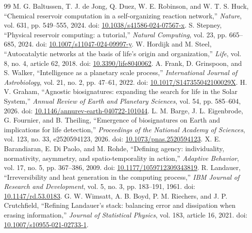 \documentclass[11pt]{article}
\begin{document}
\begin{thebibliography}{99}
 M. G. Baltussen, T. J. de Jong, Q. Duez, W. E. Robinson, and W. T. S. Huck, ``Chemical reservoir computation in a self-organizing reaction network,'' \emph{Nature}, vol. 631, pp. 549--555, 2024. doi: \href{https://doi.org/10.1038/s41586-024-07567-x}{10.1038/s41586-024-07567-x}.
 S. Stepney, ``Physical reservoir computing: a tutorial,'' \emph{Natural Computing}, vol. 23, pp. 665--685, 2024. doi: \href{https://doi.org/10.1007/s11047-024-09997-y}{10.1007/s11047-024-09997-y}.
 W. Hordijk and M. Steel, ``Autocatalytic networks at the basis of life's origin and organization,'' \emph{Life}, vol. 8, no. 4, article 62, 2018. doi: \href{https://doi.org/10.3390/life8040062}{10.3390/life8040062}.
 A. Frank, D. Grinspoon, and S. Walker, ``Intelligence as a planetary scale process,'' \emph{International Journal of Astrobiology}, vol. 21, no. 2, pp. 47--61, 2022. doi: \href{https://doi.org/10.1017/S147355042100029X}{10.1017/S147355042100029X}.
 H. V. Graham, ``Agnostic biosignatures: expanding the search for life in the Solar System,'' \emph{Annual Review of Earth and Planetary Sciences}, vol. 54, pp. 585--604, 2026. doi: \href{https://doi.org/10.1146/annurev-earth-040722-101044}{10.1146/annurev-earth-040722-101044}.
 L. M. Barge, J. L. Eigenbrode, G. Fournier, and B. Theiling, ``Emergence of biosignatures on Earth and implications for life detection,'' \emph{Proceedings of the National Academy of Sciences}, vol. 123, no. 33, e2520594123, 2026. doi: \href{https://doi.org/10.1073/pnas.2520594123}{10.1073/pnas.2520594123}.
 X. E. Barandiaran, E. Di Paolo, and M. Rohde, ``Defining agency: individuality, normativity, asymmetry, and spatio-temporality in action,'' \emph{Adaptive Behavior}, vol. 17, no. 5, pp. 367--386, 2009. doi: \href{https://doi.org/10.1177/1059712309343819}{10.1177/1059712309343819}.
 R. Landauer, ``Irreversibility and heat generation in the computing process,'' \emph{IBM Journal of Research and Development}, vol. 5, no. 3, pp. 183--191, 1961. doi: \href{https://doi.org/10.1147/rd.53.0183}{10.1147/rd.53.0183}.
 G. W. Wimsatt, A. B. Boyd, P. M. Riechers, and J. P. Crutchfield, ``Refining Landauer's stack: balancing error and dissipation when erasing information,'' \emph{Journal of Statistical Physics}, vol. 183, article 16, 2021. doi: \href{https://doi.org/10.1007/s10955-021-02733-1}{10.1007/s10955-021-02733-1}.

\end{thebibliography}
\end{document}
